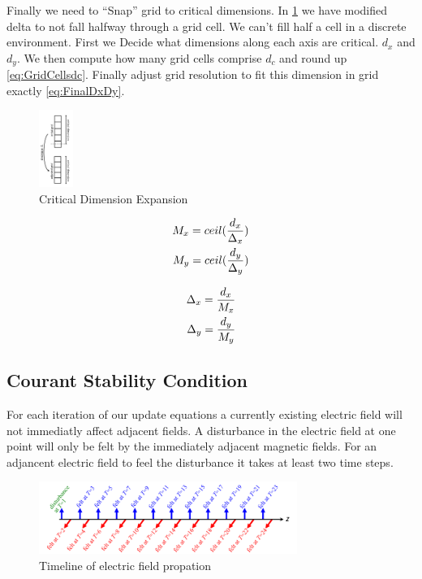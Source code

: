 \documentclass[a4paper,10pt]{article}
\begin{document}
Finally we need to ``Snap'' grid to critical dimensions.  In \ref{fig:Criticaldimension} we have modified delta to not fall halfway through a grid cell.  We can't fill half a cell in a discrete environment.  First we Decide what dimensions along each axis are critical.  $d_x$ and $d_y$.  We then compute how many grid cells comprise $d_c$ and round up \eqref{eq:GridCellsdc}.  Finally adjust grid resolution to fit this dimension in grid exactly \eqref{eq:FinalDxDy}.


\begin{figure}[ht]
  \label{fig:Criticaldimension}
   \centering
     \includegraphics[width=0.1\textwidth]{Criticaldimension.png}
   \caption{Critical Dimension Expansion}
\end{figure}


\begin{align}
 \label{eq:GridCellsdc}
 M_x = ceil(\frac{d_x}{\Delta_x})\notag\\
 M_y = ceil(\frac{d_y}{\Delta_y})
\end{align}

\begin{align}
 \label{eq:FinalDxDy}
 \Delta_x = \frac{d_x}{M_x}\notag\\
 \Delta_y = \frac{d_y}{M_y}
\end{align}


\subsection{Courant Stability Condition}

For each iteration of our update equations a currently existing electric field will not immediatly affect adjacent fields.  A disturbance in the electric field at one point will only be felt by the immediately adjacent magnetic fields.  For an adjancent electric field to feel the disturbance it takes at least two time steps.

\begin{figure}[ht]
   \centering
     \includegraphics[width=0.75\textwidth]{felttimeline.png}
   \caption{Timeline of electric field propation}
\end{figure}
\end{document}
